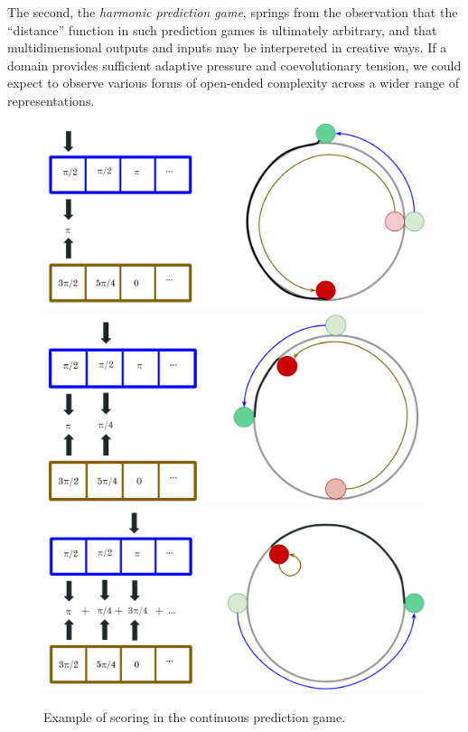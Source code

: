 \documentclass{article}
\begin{document}
The second, the \textit{harmonic prediction game}, springs from the observation that the 
``distance'' function in such prediction games is ultimately arbitrary, and that multidimensional
outputs and inputs may be interpereted in creative ways. If a domain provides sufficient 
adaptive pressure and coevolutionary tension, we could expect to observe various forms
of open-ended complexity across a wider range of representations.

\begin{figure}[H]
    \begin{center}
        \includegraphics[width=4.5in]{con2.png}
        \includegraphics[width=4.5in]{con3.png}
        \includegraphics[width=4.5in]{con4.png}
        \caption{Example of scoring in the continuous prediction game.}
        \label{continuous}
    \end{center}
\end{figure}
\end{document}

